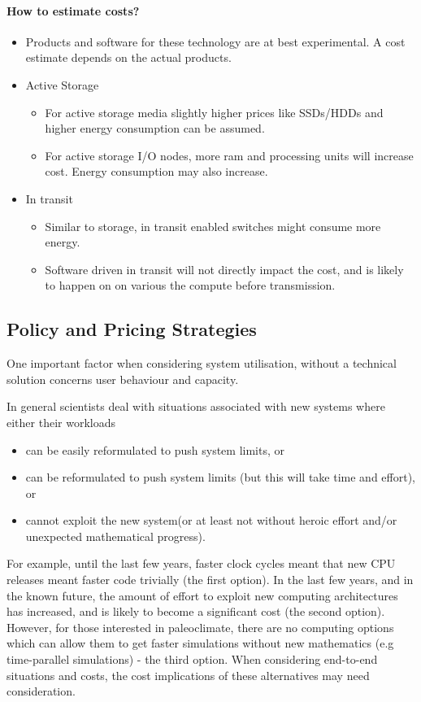 \documentclass{../../template/esiwace-report}
\begin{document}
\paragraph{How to estimate costs?}
\begin{itemize}
	\item Products and software for these technology are at best experimental. A cost estimate depends on the actual products.

	\item Active Storage
	\begin{itemize}
		\item For active storage media slightly higher prices like SSDs/HDDs and higher energy consumption can be assumed.
		\item For active storage I/O nodes, more ram and processing units will increase cost. Energy consumption may also increase.
	\end{itemize}

	\item In transit
	\begin{itemize}
		\item Similar to storage, in transit enabled switches might consume more energy.
		\item Software driven in transit will not directly impact the cost, and is likely to happen on on various the compute before transmission.
	\end{itemize}
\end{itemize}




\subsection{Policy and Pricing Strategies}

One important factor when considering system utilisation, without a technical solution concerns user behaviour and capacity.

In general scientists deal with situations associated with new systems where either their workloads
\begin{itemize}
\item can be easily reformulated to push system limits, or
\item can be reformulated to push system limits (but this will take time and effort), or
\item cannot exploit the new system(or at least not without heroic effort and/or unexpected mathematical progress).
\end{itemize}
For example, until the last few years, faster clock cycles meant that new CPU
releases meant faster code trivially (the first option). In the last few years,
and in the known future, the amount of effort to exploit new computing
architectures has increased, and is likely to become a significant cost (the
second option). However, for those interested in paleoclimate, there are no
computing options which can allow them to get faster simulations without new
mathematics (e.g time-parallel simulations) - the third option. When considering
end-to-end situations and costs, the cost implications of these alternatives may
need consideration.
\end{document}
